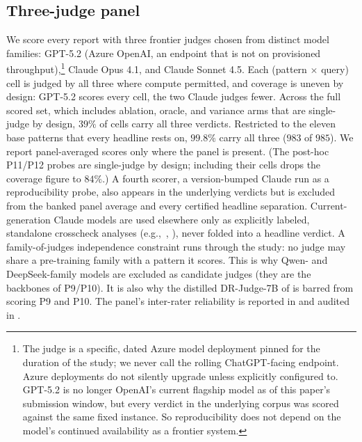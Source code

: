\documentclass[11pt]{article}
\newcommand{\eg}{e.g.,\ }
\begin{document}
\subsection{Three-judge panel}
We score every report with three frontier judges chosen from distinct model families:
GPT-5.2 (Azure OpenAI, an endpoint that is not on provisioned throughput),\footnote{The judge is a
specific, dated Azure model deployment pinned for the duration of the study; we never call
the rolling ChatGPT-facing endpoint. Azure deployments do not silently upgrade unless
explicitly configured to. GPT-5.2 is no longer OpenAI's current flagship model as of this
paper's submission window, but every verdict in the underlying corpus was scored against
the same fixed instance. So reproducibility does not depend on the model's continued
availability as a frontier system.} Claude Opus 4.1, and Claude Sonnet 4.5.
Each (pattern $\times$ query) cell is judged by all three where compute permitted, and coverage
is uneven by design: GPT-5.2 scores every cell, the two Claude judges fewer. Across the full
scored set, which includes ablation, oracle, and variance arms that are single-judge by design, $39\%$
of cells carry all three verdicts. Restricted to the eleven base patterns that every headline
rests on, $99.8\%$ carry all three ($983$ of $985$). We report panel-averaged scores only
where the panel is present. (The post-hoc P11/P12 probes are single-judge by design; including
their cells drops the coverage figure to $84\%$.) A
fourth scorer, a version-bumped Claude run as a reproducibility probe, also appears in the
underlying verdicts but is excluded from the banked panel average and every certified
headline separation. Current-generation Claude models are used elsewhere only as explicitly
labeled, standalone crosscheck analyses (\eg {}, ),
never folded into a headline verdict.
A family-of-judges independence constraint runs through the study: no judge may share
a pre-training family with a pattern it scores. This is why Qwen- and DeepSeek-family
models are excluded as candidate judges (they are the backbones of P9/P10). It is also why the
distilled DR-Judge-7B of  is barred from scoring P9 and P10. The
panel's inter-rater reliability is reported in  and audited in
.
\end{document}
